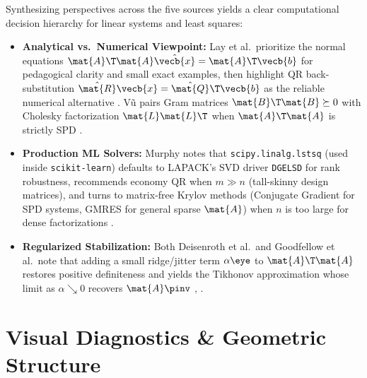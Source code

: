 \documentclass[../../../../master.tex]{subfiles}
\begin{document}
\begin{crossbook}
Synthesizing perspectives across the five sources yields a clear computational decision hierarchy for linear systems and least squares:
\begin{itemize}[leftmargin=1.4em]
  \item \textbf{Analytical vs.\ Numerical Viewpoint:} Lay et al.\ prioritize the normal equations $\mat{A}\T\mat{A}\hat{\vecb{x}} = \mat{A}\T\vecb{b}$ for pedagogical clarity and small exact examples, then highlight QR back-substitution $\hat{\mat{R}}\vecb{x} = \hat{\mat{Q}}\T\vecb{b}$ as the reliable numerical alternative . V\~{u} pairs Gram matrices $\mat{B}\T\mat{B} \succeq 0$ with Cholesky factorization $\mat{L}\mat{L}\T$ when $\mat{A}\T\mat{A}$ is strictly SPD .
  \item \textbf{Production ML Solvers:} Murphy notes that \texttt{scipy.linalg.lstsq} (used inside \texttt{scikit-learn}) defaults to LAPACK's SVD driver \texttt{DGELSD} for rank robustness, recommends economy QR when $m \gg n$ (tall-skinny design matrices), and turns to matrix-free Krylov methods (Conjugate Gradient for SPD systems, GMRES for general sparse $\mat{A}$) when $n$ is too large for dense factorizations .
  \item \textbf{Regularized Stabilization:} Both Deisenroth et al.\ and Goodfellow et al.\ note that adding a small ridge/jitter term $\alpha\eye$ to $\mat{A}\T\mat{A}$ restores positive definiteness and yields the Tikhonov approximation whose limit as $\alpha \searrow 0$ recovers $\mat{A}\pinv$ , .
\end{itemize}
\end{crossbook}

\section{Visual Diagnostics \& Geometric Structure}
\label{sec:vecnorm:visuals}
\end{document}
